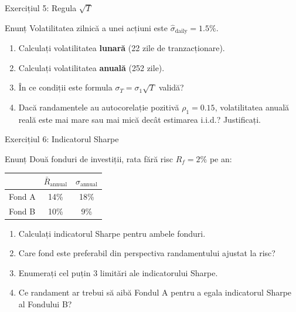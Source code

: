 \documentclass[9pt, aspectratio=169, t]{beamer}
\theoremstyle{definition}
\begin{document}
\begin{frame}{Exercițiul 5: Regula $\sqrt{T}$}
\begin{block}{Enunț}
Volatilitatea zilnică a unei acțiuni este $\hat{\sigma}_{\text{daily}} = 1.5\%$.
\end{block}
\begin{enumerate}
    \item Calculați volatilitatea \textbf{lunară} (22 zile de tranzacționare).
    \item Calculați volatilitatea \textbf{anuală} (252 zile).
    \item În ce condiții este formula $\sigma_T = \sigma_1\sqrt{T}$ validă?
    \item Dacă randamentele au autocorelație pozitivă $\rho_1 = 0.15$, volatilitatea anuală reală este mai mare sau mai mică decât estimarea i.i.d.? Justificați.
\end{enumerate}
\end{frame}

\begin{frame}{Exercițiul 6: Indicatorul Sharpe}
\begin{block}{Enunț}
Două fonduri de investiții, rata fără risc $R_f = 2\%$ pe an:
\begin{center}
{\small
\renewcommand{\arraystretch}{1.2}
\begin{tabular}{lcc}
\toprule
& $\bar{R}_{\text{annual}}$ & $\sigma_{\text{annual}}$ \\
\midrule
Fond A & 14\% & 18\% \\
Fond B & 10\% & 9\% \\
\bottomrule
\end{tabular}
}
\end{center}
\end{block}
\begin{enumerate}
    \item Calculați indicatorul Sharpe pentru ambele fonduri.
    \item Care fond este preferabil din perspectiva randamentului ajustat la risc?
    \item Enumerați cel puțin 3 limitări ale indicatorului Sharpe.
    \item Ce randament ar trebui să aibă Fondul A pentru a egala indicatorul Sharpe al Fondului B?
\end{enumerate}
\end{frame}
\end{document}
